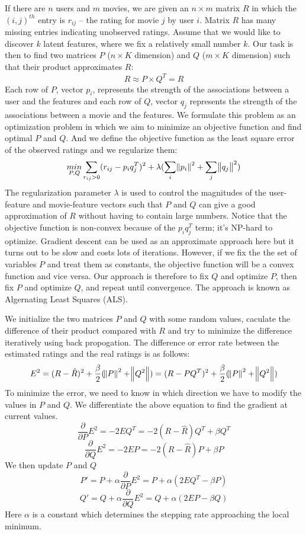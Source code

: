 \documentclass{article}
\begin{document}
If there are $n$ users and $m$ movies, we are given an $n\times m$ matrix $R$ in which the $(i,j)^{th}$ entry is $r_{ij}$ -- the rating for movie $j$ by user $i$. Matrix $R$ has many missing entries indicating unobserved ratings. Assume that we would like to discover $k$ latent features, where we fix a relatively small number $k$. Our task is then to find two matrices $P$ ($n\times K$ dimension) and $Q$ ($m\times K$ dimension) such that their product approximates $R$:
\[ R \approx P \times Q^T = \hat{R}
\]
Each row of $P$, vector $p_i$, represents the strength of the associations between a user and the features and each row of $Q$, vector $q_j$ represents the strength of the associations between a movie and the features. We formulate this problem as an optimization problem in which we aim to minimize an objective function and find optimal $P$ and $Q$. And we define the objective function as the least square error of the observed ratings and we regularize them:
\[ \underset{P,Q}{min} \sum\limits_{r_{ij}>0}(r_{ij}-p_iq_j^T)^2+\lambda(\sum\limits_i\norm{p_i}^2+\sum\limits_j\norm{q_j}^2 )
\]
The regularization parameter $\lambda$ is used to control the magnitudes of the user-feature and movie-feature vectors such that $P$ and $Q$ can give a good approximation of $R$ without having to contain large numbers. Notice that the objective function is non-convex because of the $p_iq_j^T$ term; it's NP-hard to optimize. Gradient descent can be used as an approximate approach here but it turns out to be slow and costs lots of iterations. However, if we fix the the set of variables $P$ and treat them as constants, the objective function will be a convex function and vice versa. Our approach is therefore to fix $Q$ and optimize $P$, then fix $P$ and optimize $Q$, and repeat until convergence. The approach is known as Algernating Least Squares (ALS). 

We initialize the two matrices $P$ and $Q$ with some random values, caculate the difference of their product compared with $R$ and try to minimize the difference iteratively using back propogation. The difference or error rate between the estimated ratings and the real ratings is as follows:
\[ E^2 = (R-\hat{R})^2+\frac{\beta}{2}(\norm{P}^2+\norm{Q^2}) = (R-PQ^T)^2+\frac{\beta}{2}(\norm{P}^2+\norm{Q^2})
\]
To minimize the error, we need to know in which direction we have to modify the values in $P$ and $Q$. We differentiate the above equation to find the gradient at current values. 
\[
\frac{\partial}{\partial P}E^2 = -2EQ^T=-2(R-\hat{R})Q^T + \beta Q^T\]
\[\frac{\partial}{\partial Q}E^2 = -2EP=-2(R-\hat{R})P +\beta P
\]
We then update $P$ and $Q$
\[
P'= P+\alpha\frac{\partial}{\partial P}E^2 = P+\alpha(2EQ^T-\beta P)\]
\[Q'= Q+\alpha\frac{\partial}{\partial Q}E^2 = Q+\alpha(2EP-\beta Q)
\]
Here $\alpha$ is a constant which determines the stepping rate approaching the local minimum. 
\end{document}
